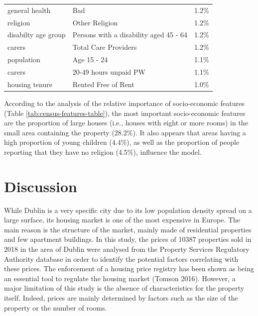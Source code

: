 \documentclass[conference,final,]{IEEEtran}
\begin{document}
\begin{table}
\begin{tabular}[t]{lll}
general health & Bad & 1.2\%\\
religion & Other Religion & 1.2\%\\
disabilty age group & Persons with a disability aged 45 - 64 & 1.2\%\\
carers & Total Care Providers & 1.2\%\\
population & Age 15 - 24 & 1.1\%\\
carers & 20-49 hours unpaid PW & 1.1\%\\
housing tenure & Rented Free of Rent & 1.0\%\\
\bottomrule
\end{tabular}
\end{table}

According to the analysis of the relative importance of socio-economic features (Table \ref{tab:census-features-table}), the most important socio-economic features are the proportion of large houses (i.e., houses with eight or more rooms) in the small area containing the property (28.2\%). It also appears that areas having a high proportion of young children (4.4\%), as well as the proportion of people reporting that they have no religion (4.5\%), influence the model.

\hypertarget{discussion}{%
\section{Discussion}\label{discussion}}

While Dublin is a very specific city due to its low population density spread on a large surface, its housing market is one of the most expensive in Europe. The main reason is the structure of the market, mainly made of residential properties and few apartment buildings. In this study, the prices of 10387 properties sold in 2018 in the area of Dublin were analysed from the Property Services Regulatory Authority database in order to identify the potential factors correlating with these prices. The enforcement of a housing price registry has been shown as being an essential tool to regulate the housing market (Tomson 2016). However, a major limitation of this study is the absence of characteristics for the property itself. Indeed, prices are mainly determined by factors such as the size of the property or the number of rooms.
\end{document}
